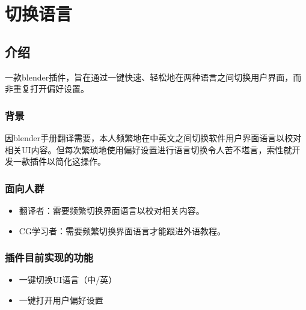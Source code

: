 \documentclass{../../PublicResources/DocClass}
\begin{document}
    \maketitle
    \frontmatter
    \clearpage
    
    \clearpage
    {\centering \tableofcontents} %
    \mainmatter

    \chapter{切换语言}
    \section{介绍}
    一款blender插件，旨在通过一键快速、轻松地在两种语言之间切换用户界面，而非重复打开偏好设置。

    \subsection{背景}
    因blender手册翻译需要，本人频繁地在中英文之间切换软件用户界面语言以校对相关UI内容。但每次繁琐地使用偏好设置进行语言切换令人苦不堪言，索性就开发一款插件以简化这操作。

    \subsection{面向人群}
    \begin{itemize}
        \item 翻译者：需要频繁切换界面语言以校对相关内容。
        \item CG学习者：需要频繁切换界面语言才能跟进外语教程。
    \end{itemize}

    \subsection{插件目前实现的功能}
    \begin{itemize}
        \item 一键切换UI语言（中/英）
        \item 一键打开用户偏好设置
    \end{itemize}
\end{document}
